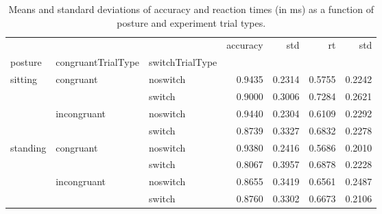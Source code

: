 \begin{table}
\centering
\caption{Means and standard deviations of accuracy and reaction times (in ms) as a function of posture and experiment trial types.}
\label{table-task-switching-replication-reaction-time}
\begin{tabular}{lllrrrr}
\toprule
         &             &        & accuracy &    std &     rt &    std \\
posture & congruantTrialType & switchTrialType &          &        &        &        \\
\midrule
sitting & congruant & noswitch &   0.9435 & 0.2314 & 0.5755 & 0.2242 \\
         &             & switch &   0.9000 & 0.3006 & 0.7284 & 0.2621 \\
         & incongruant & noswitch &   0.9440 & 0.2304 & 0.6109 & 0.2292 \\
         &             & switch &   0.8739 & 0.3327 & 0.6832 & 0.2278 \\
standing & congruant & noswitch &   0.9380 & 0.2416 & 0.5686 & 0.2010 \\
         &             & switch &   0.8067 & 0.3957 & 0.6878 & 0.2228 \\
         & incongruant & noswitch &   0.8655 & 0.3419 & 0.6561 & 0.2487 \\
         &             & switch &   0.8760 & 0.3302 & 0.6673 & 0.2106 \\
\bottomrule
\end{tabular}
\end{table}
